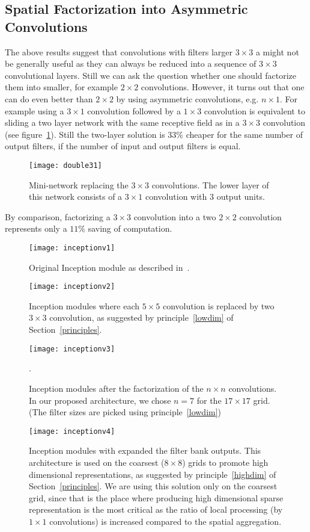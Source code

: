 \documentclass[10pt,twocolumn,letterpaper]{article}
\begin{document}
\subsection{Spatial Factorization into Asymmetric Convolutions}
The above results suggest that convolutions with filters larger
$3\times 3$  a might
not be generally useful as they can always be reduced into a sequence of
$3\times 3$ convolutional layers.
Still we can ask the question whether one should factorize them into smaller,
for example $2\times 2$ convolutions.
However, it turns out that one can do even better than $2\times 2$
by using asymmetric convolutions, e.g. $n\times 1$.
For example using a $3\times 1$ convolution followed by a $1\times 3$
convolution is equivalent to sliding a two layer network with the same
receptive field as in a $3\times 3$ convolution (see figure~\ref{fig:double31}).
Still the two-layer solution is $33\%$ cheaper for the same number of
output filters, if the number of input and output filters is equal.
\begin{figure}
\centering
\texttt{[image: double31]}
\caption{Mini-network replacing the $3\times 3$ convolutions.
  The lower layer of this network consists of a $3\times 1$ convolution with
  $3$ output units.}
\label{fig:double31}
\end{figure}
By comparison, factorizing a $3\times 3$
convolution into a two $2\times 2$ convolution represents only a $11\%$ saving
of computation.
\begin{figure}
\centering
\texttt{[image: inceptionv1]}
\caption{Original Inception module as described in~\cite{szegedy2015going}.}
\label{fig:inceptionv1}
\end{figure}
\begin{figure}
\centering
\texttt{[image: inceptionv2]}
\caption{Inception modules where each $5\times 5$ convolution is replaced by
  two $3\times 3$ convolution, as suggested by principle~\ref{lowdim} of Section~\ref{principles}.}
\label{fig:inceptionv2}
\end{figure}
\begin{figure}
\centering
\texttt{[image: inceptionv3]}
\caption{Inception modules after the factorization of the $n\times n$
convolutions. In our proposed architecture, we chose $n=7$ for the
$17\times 17$ grid. (The filter sizes are picked using principle~\ref{lowdim})}.
\label{fig:inceptionv3}
\end{figure}
\begin{figure}
\centering
\texttt{[image: inceptionv4]}
\caption{Inception modules with expanded the filter bank outputs. This
  architecture is used on the coarsest ($8\times 8$) grids to promote
high dimensional representations, as suggested by principle~\ref{highdim} of Section~\ref{principles}.
We are using this solution only on the coarsest grid, since that is the place
where producing high dimensional sparse representation is the most critical
as the ratio of local processing (by $1\times 1$ convolutions) is increased
compared to the spatial aggregation.}
\label{fig:inceptionv4}
\end{figure}
\end{document}
